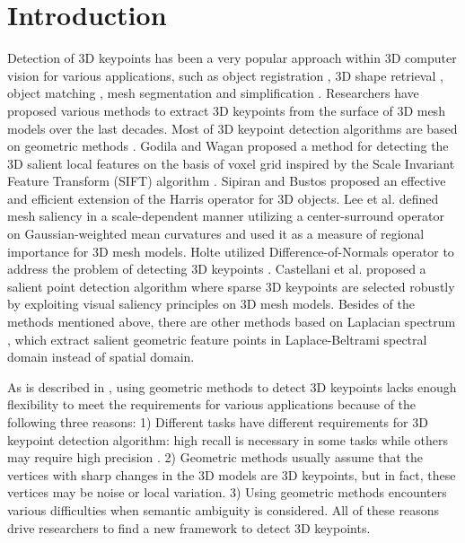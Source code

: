 \documentclass[runningheads]{article}
\begin{document}
\section{Introduction}
Detection of 3D keypoints has been a very popular approach within 3D computer vision for various applications, such as object registration \cite{Registration2005robust}, 3D shape retrieval \cite{Retrieval2004shape}, object matching \cite{hu2009salient}, mesh segmentation \cite{segmentation2005mesh} and simplification \cite{Meshsaliency2005mesh}. Researchers have proposed various methods to extract 3D keypoints from the surface of 3D mesh models over the last decades. Most of 3D keypoint detection algorithms are based on geometric methods \cite{Meshsaliency2005mesh,3Dsift2011salient,3Dharris2011harris,sun2009concise,novatnack2007scale,don20143d,castellani2008sparse,wang2013sdtp,akagunduz2009scale,meshdog2009,LSP20073d,ISS2009,KPS2010repeatability,LBSS2008,scakemeshdog}. Godila and Wagan \cite{3Dsift2011salient} proposed a method for detecting the 3D salient local features on the  basis of voxel grid inspired by the Scale Invariant Feature Transform (SIFT) algorithm \cite{sift2004distinctive}. Sipiran and Bustos \cite{3Dharris2011harris} proposed an effective and efficient extension of the Harris operator \cite{harris1988combined} for 3D objects. Lee et al. \cite{Meshsaliency2005mesh} defined mesh saliency in a scale-dependent manner utilizing a center-surround operator on Gaussian-weighted mean curvatures and used it as a measure of regional importance for 3D mesh models. Holte utilized Difference-of-Normals operator to address the problem of detecting 3D keypoints \cite{don20143d}. Castellani et al. \cite{castellani2008sparse} proposed a salient point detection algorithm where sparse 3D keypoints are selected robustly by exploiting visual saliency principles on 3D mesh models. Besides of the methods mentioned above, there are other methods based on Laplacian spectrum \cite{hu2009salient,song20133d,song2014mesh}, which extract salient geometric feature points in Laplace-Beltrami spectral domain instead of spatial domain.

As is described in \cite{randomforest20143d}, using geometric methods to detect 3D keypoints lacks enough flexibility to meet the requirements for various applications because of the following three reasons: 1) Different tasks have different requirements for 3D keypoint detection algorithm: high recall is necessary in some tasks while others may require high precision \cite{mikolajczyk2005performance}. 2) Geometric methods usually assume that the vertices with sharp changes in the 3D models are 3D keypoints, but in fact, these vertices may be noise or local variation. 3) Using geometric methods encounters various difficulties when semantic ambiguity is considered. All of these reasons drive researchers to find a new framework to detect 3D keypoints. 
\end{document}
